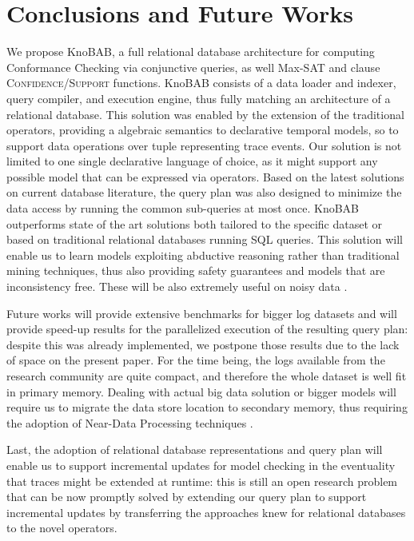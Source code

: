 \section{Conclusions and Future Works}
We propose KnoBAB, a full relational database architecture for computing Conformance Checking via conjunctive queries, as well Max-SAT and clause \textsc{Confidence}/\textsc{Support} functions.  KnoBAB consists of a data loader and indexer, query compiler, and execution engine, thus fully matching an architecture of a relational database. This solution was enabled by the extension of the traditional \LTLf operators, providing a algebraic semantics to declarative temporal models, so to support data operations over tuple representing trace  events. Our solution is not limited to one single declarative language of choice, as it might support any possible model that can be expressed via \xLTLf operators. Based on the latest solutions on current database literature, the query plan was also designed to minimize the data access by running the common sub-queries at most once.
%
KnoBAB outperforms state of the art solutions both tailored to the specific dataset or based on traditional relational databases running SQL queries.  This solution will enable us to learn models exploiting abductive reasoning rather than traditional mining techniques, thus also providing safety guarantees and models that are inconsistency free. These will be also extremely useful on  noisy data \cite{PicadoDTL20}.

Future works will provide extensive benchmarks for bigger log datasets and will provide speed-up results for the parallelized execution of the resulting query plan: despite this was already implemented, we postpone those results due to the lack of space on the present paper. For the time being, the logs available from the research community are quite compact, and therefore the whole dataset is well fit in primary memory. Dealing with actual big data solution or bigger models will require us to migrate the data store location to secondary memory, thus requiring the adoption of Near-Data Processing techniques \cite{GuYBJLYKKYCJC16}. 

Last, %
the adoption of relational database representations and query plan will enable us to support incremental updates for model checking in the eventuality that traces might be extended at runtime: this is still an open research problem \cite{Polyvyanyy2022} that can be now promptly solved by extending our query plan to support incremental updates by transferring the approaches knew for relational databases to the novel \xLTLf operators. 

